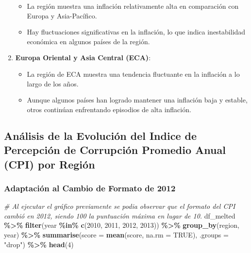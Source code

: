 \documentclass[
]{article}
\newenvironment{Shaded}{\begin{snugshade}}{\end{snugshade}}
\newcommand{\AttributeTok}[1]{\textcolor[rgb]{0.13,0.29,0.53}{#1}}
\newcommand{\CommentTok}[1]{\textcolor[rgb]{0.56,0.35,0.01}{\textit{#1}}}
\newcommand{\ConstantTok}[1]{\textcolor[rgb]{0.56,0.35,0.01}{#1}}
\newcommand{\DecValTok}[1]{\textcolor[rgb]{0.00,0.00,0.81}{#1}}
\newcommand{\FunctionTok}[1]{\textcolor[rgb]{0.13,0.29,0.53}{\textbf{#1}}}
\newcommand{\NormalTok}[1]{#1}
\newcommand{\SpecialCharTok}[1]{\textcolor[rgb]{0.81,0.36,0.00}{\textbf{#1}}}
\newcommand{\StringTok}[1]{\textcolor[rgb]{0.31,0.60,0.02}{#1}}
\providecommand{\tightlist}{%
  \setlength{\itemsep}{0pt}\setlength{\parskip}{0pt}}
\begin{document}
\begin{enumerate}
  \begin{itemize}
  \tightlist
  \item
    La región muestra una inflación relativamente alta en comparación
    con Europa y Asia-Pacífico.
  \item
    Hay fluctuaciones significativas en la inflación, lo que indica
    inestabilidad económica en algunos países de la región.
  \end{itemize}
\item
  \textbf{Europa Oriental y Asia Central (ECA)}:

  \begin{itemize}
  \tightlist
  \item
    La región de ECA muestra una tendencia fluctuante en la inflación a
    lo largo de los años.
  \item
    Aunque algunos países han logrado mantener una inflación baja y
    estable, otros continúan enfrentando episodios de alta inflación.
  \end{itemize}
\end{enumerate}

\subsection{Análisis de la Evolución del Indice de Percepción de
Corrupción Promedio Anual (CPI) por
Región}\label{analisis-de-la-evolucion-del-indice-de-percepcion-de-corrupcion-promedio-anual-cpi-por-region}

\subsubsection{Adaptación al Cambio de Formato de
2012}\label{adaptacion-formato-cpi}

\begin{Shaded}
\begin{Highlighting}[]
\CommentTok{\# Al ejecutar el gráfico previamente se podia observar que el formato del CPI cambió en 2012, siendo 100 la puntuación máxima en lugar de 10.}
\NormalTok{df\_melted }\SpecialCharTok{\%\textgreater{}\%}
    \FunctionTok{filter}\NormalTok{(year }\SpecialCharTok{\%in\%} \FunctionTok{c}\NormalTok{(}\DecValTok{2010}\NormalTok{, }\DecValTok{2011}\NormalTok{, }\DecValTok{2012}\NormalTok{, }\DecValTok{2013}\NormalTok{)) }\SpecialCharTok{\%\textgreater{}\%}
    \FunctionTok{group\_by}\NormalTok{(region, year) }\SpecialCharTok{\%\textgreater{}\%}
    \FunctionTok{summarise}\NormalTok{(}\AttributeTok{score =} \FunctionTok{mean}\NormalTok{(score, }\AttributeTok{na.rm =} \ConstantTok{TRUE}\NormalTok{), }\AttributeTok{.groups =} \StringTok{"drop"}\NormalTok{) }\SpecialCharTok{\%\textgreater{}\%}
    \FunctionTok{head}\NormalTok{(}\DecValTok{4}\NormalTok{)}
\end{Highlighting}
\end{Shaded}
\end{document}
